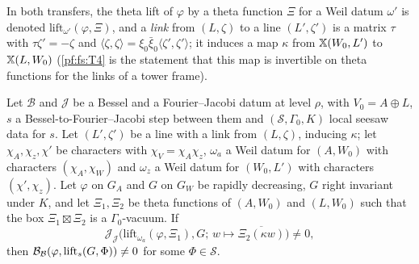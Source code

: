 In both transfers, the theta lift of $\varphi$ by a theta function $\Xi$ for a Weil datum $\omega'$ is denoted $\mathrm{lift}_{\omega'}(\varphi,\Xi)$, and
a \emph{link} from $(L,\zeta)$ to a line $(L',\zeta')$ is a matrix $\tau$ with $\tau\zeta'=-\zeta$ and
$\langle\zeta,\zeta\rangle=\xi_0\bar\xi_0\langle\zeta',\zeta'\rangle$; it induces a map $\kappa$ from $\mathbb X(W_0,L')$ to $\mathbb X(L,W_0)$
(\ref{pf:fs:T4} is the statement that this map is invertible on theta functions for the links of a tower frame).

\begin{proposition}\label{pf:fs:upBF}
Let $\mathcal B$ and $\mathcal J$ be a Bessel and a Fourier--Jacobi datum at level $\rho$, with $V_0=A\oplus L$, $s$ a
Bessel-to-Fourier--Jacobi step between them and $(\mathcal S,\Gamma_0,K)$ local seesaw data for $s$. Let $(L',\zeta')$ be a line with a
link from $(L,\zeta)$, inducing $\kappa$; let $\chi_A,\chi_z,\chi'$ be characters with $\chi_V=\chi_A\chi_z$, $\omega_a$ a Weil datum for
$(A,W_0)$ with characters $(\chi_A,\chi_W)$ and $\omega_z$ a Weil datum for $(W_0,L')$ with characters $(\chi',\chi_z)$. Let $\varphi$ on
$G_A$ and $G$ on $G_W$ be rapidly decreasing, $G$ right invariant under $K$, and let $\Xi_1,\Xi_2$ be theta functions of $(A,W_0)$ and
$(L,W_0)$ such that the box $\Xi_1\boxtimes\Xi_2$ is a $\Gamma_0$-vacuum. If
\[
\mathcal J_{\mathcal J}\bigl(\mathrm{lift}_{\omega_a}(\varphi,\Xi_1),G;\,w\mapsto\overline{\Xi_2(\kappa w)}\bigr)\neq0,
\]
then $\mathcal B_{\mathcal B}(\varphi,\mathrm{lift}_s(G,\Phi))\ne0$ for some $\Phi\in\mathcal S$.
\end{proposition}

